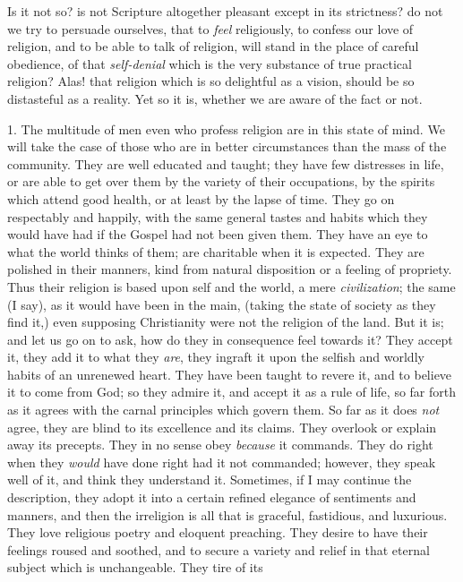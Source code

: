 Is it not so? is not Scripture altogether pleasant
except in its strictness? do not we try to persuade
ourselves, that to \emph{feel} religiously, to confess
our love of religion, and to be able to talk of religion,
will stand in the place of careful obedience, of that \emph{self-denial}
which is the very substance of true practical religion?
Alas! that religion which is so delightful as a vision,
should be so distasteful as a reality. Yet so it is,
whether we are aware of the fact or not.

1. The multitude of men even who profess religion are
in this state of mind. We will take the case of those who
are in better circumstances than the mass of the
community. They are well educated and taught; they have
few distresses in life, or are able to get over them by
the variety of their occupations, by the spirits which
attend good health, or at least by the lapse of time.
They go on respectably and happily, with the same general
tastes and habits which they would have had if the Gospel
had not been given them. They have an eye to what the
world thinks of them; are charitable when it is expected.
They are polished in their manners, kind from natural
disposition or a feeling of propriety. Thus their
religion is based upon self and the world, a mere \emph{civilization};
the same (I say), as it would have been in the main,
(taking the state of society as they find it,) even
supposing Christianity were not the religion of the land.
But it is; and let us go on to ask, how do they in
consequence feel towards it? They accept it, they add it
to what they \emph{are}, they ingraft it upon the
selfish and worldly habits of an unrenewed heart. They
have been taught to revere it, and to believe it to come
from God; so they admire it, and accept it as a rule of
life, so far forth as it agrees with the carnal
principles which govern them. So far as it does \emph{not}
agree, they are blind to its excellence and its claims.
They overlook or explain away its precepts. They in no
sense obey \emph{because} it commands. They do right
when they \emph{would} have done right had it not
commanded; however, they speak well of it, and think they
understand it. Sometimes, if I may continue the
description, they adopt it into a certain refined
elegance of sentiments and manners, and then the
irreligion is all that is graceful, fastidious, and
luxurious. They love religious poetry and eloquent
preaching. They desire to have their feelings roused and
soothed, and to secure a variety and relief in that
eternal subject which is unchangeable. They tire of its

